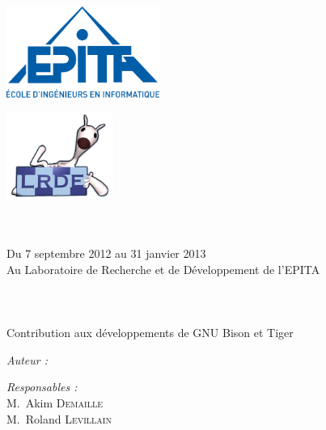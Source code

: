 
\begin{titlepage}

\begin{center}
\begin{minipage}[t]{0.48\textwidth}
  \begin{flushleft}
    \includegraphics [width=50mm]{images/logo-epita.png} \\[0.5cm]
    \begin{spacing}{1.5}
    \end{spacing}
  \end{flushleft}
\end{minipage}
\begin{minipage}[t]{0.48\textwidth}
  \begin{flushright}
    \includegraphics [width=35mm]{images/logo-lrde.png} \\[0.5cm]
  \end{flushright}
\end{minipage} \\[1.5cm]

\textsc{\Large \reportsubject}\\[0.5cm]
{\large Du 7 septembre 2012 au 31 janvier 2013}\\[0.1cm]
{\large Au Laboratoire de Recherche et de Développement de l'EPITA}\\[0.5cm]
\HRule \\[0.4cm]
{\huge \bfseries \reporttitle}\\[0.4cm]
\HRule \\[1.5cm]

{\large Contribution aux développements de GNU Bison et Tiger}\\[1.0cm]

\begin{minipage}[t]{0.3\textwidth}
  \begin{flushleft} \large
    \emph{Auteur :}\\
    \reportauthor
  \end{flushleft}
\end{minipage}
\begin{minipage}[t]{0.6\textwidth}
  \begin{flushright} \large
    \emph{Responsables :} \\
    M.~Akim \textsc{Demaille} \\
    M.~Roland \textsc{Levillain}
  \end{flushright}
\end{minipage}


\end{center}
\end{titlepage}
